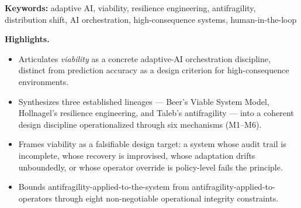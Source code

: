 \begin{abstract}
\noindent Predictive optimization has reached structural limits as the design
criterion for adaptive AI systems in high-consequence environments.
Systems trained to maximize accuracy against expected future
distributions fail under distribution shift, and the failure is not
graceful: prediction-optimized systems collapse where the prediction was
wrong. This paper argues that the next generation of adaptive AI
orchestration must be designed for \emph{viability} rather than for
prediction accuracy --- engineered to remain operational across futures
that include the unforeseen, the rare, and the actively adversarial. The
argument synthesizes three established lineages: Beer's Viable System
Model \cite{ref1}, Hollnagel's resilience engineering \cite{ref2}, and Taleb's
antifragility \cite{ref3}. The contribution of this paper is not to restate
those frameworks but to articulate viability as a concrete adaptive-AI
orchestration discipline: an architecture in which audit-first command
flow, modular subsystem construction with strict separation of concerns,
bounded recovery pathways, tail-event preparation, and preserved
operator authority together produce a system that does not require
accurate prediction to remain useful. The discipline is illustrated
using MILO, a patent-pending adaptive AI orchestrator \cite{ref4} submitted
to the U.S. Department of Energy under the Genesis Mission \cite{ref5}. The
unifying principle is stated plainly: \emph{MILO does not predict the
future. It remains viable in any future.}
\end{abstract}

\noindent\textbf{Keywords:} adaptive AI, viability, resilience engineering,
antifragility, distribution shift, AI orchestration, high-consequence
systems, human-in-the-loop\par

\textbf{Highlights.}

\begin{itemize}
\tightlist
\item
  Articulates \emph{viability} as a concrete adaptive-AI orchestration
  discipline, distinct from prediction accuracy as a design criterion
  for high-consequence environments.
\item
  Synthesizes three established lineages --- Beer's Viable System Model,
  Hollnagel's resilience engineering, and Taleb's antifragility --- into
  a coherent design discipline operationalized through six mechanisms
  (M1--M6).
\item
  Frames viability as a falsifiable design target: a system whose audit
  trail is incomplete, whose recovery is improvised, whose adaptation
  drifts unboundedly, or whose operator override is policy-level fails
  the principle.
\item
  Bounds antifragility-applied-to-the-system from
  antifragility-applied-to-operators through eight non-negotiable
  operational integrity constraints.
\end{itemize}

